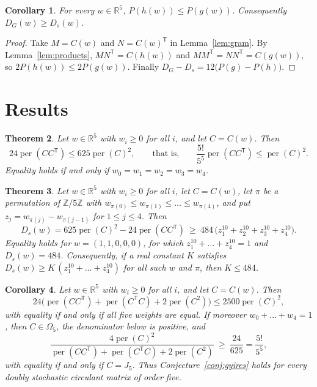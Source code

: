\documentclass[11pt,a4paper]{article}
\newtheorem{theorem}{Theorem}[section]
\newtheorem{corollary}[theorem]{Corollary}
\theoremstyle{definition}
\theoremstyle{remark}
\newcommand{\R}{\mathbb{R}}
\newcommand{\Z}{\mathbb{Z}}
\newcommand{\per}{\operatorname{per}}
\newcommand{\T}{\mathsf{T}}
\begin{document}
\begin{corollary}\label{cor:gram}
For every $w\in\R^5$, $P(h(w))\le P(g(w))$. Consequently $D_G(w)\ge D_s(w)$.
\end{corollary}

\begin{proof}
Take $M=C(w)$ and $N=C(w)^\T$ in Lemma~\ref{lem:gram}. By Lemma~\ref{lem:products}, $MN^\T=C(h(w))$ and
$MM^\T=NN^\T=C(g(w))$, so $2P(h(w))\le2P(g(w))$. Finally $D_G-D_s=12\bigl(P(g)-P(h)\bigr)$.
\end{proof}

\section{Results}\label{sec:results}

\begin{theorem}\label{thm:strong}
Let $w\in\R^5$ with $w_i\ge0$ for all $i$, and let $C=C(w)$. Then
\[
24\per(CC^\T)\le625\per(C)^2,\qquad\text{that is,}\qquad \frac{5!}{5^5}\per(CC^\T)\le\per(C)^2 .
\]
Equality holds if and only if $w_0=w_1=w_2=w_3=w_4$.
\end{theorem}

\begin{theorem}\label{thm:margin}
Let $w\in\R^5$ with $w_i\ge0$ for all $i$, let $C=C(w)$, let $\pi$ be a permutation of $\Z/5\Z$ with
$w_{\pi(0)}\le w_{\pi(1)}\le\dots\le w_{\pi(4)}$, and put $z_j=w_{\pi(j)}-w_{\pi(j-1)}$ for $1\le j\le4$. Then
\[
D_s(w)=625\per(C)^2-24\per(CC^\T)\ \ge\ 484\,\bigl(z_1^{10}+z_2^{10}+z_3^{10}+z_4^{10}\bigr).
\]
Equality holds for $w=(1,1,0,0,0)$, for which $z_1^{10}+\dots+z_4^{10}=1$ and $D_s(w)=484$. Consequently, if a real
constant $K$ satisfies $D_s(w)\ge K\,(z_1^{10}+\dots+z_4^{10})$ for all such $w$ and $\pi$, then $K\le484$.
\end{theorem}

\begin{corollary}\label{cor:gyires}
Let $w\in\R^5$ with $w_i\ge0$ for all $i$, and let $C=C(w)$. Then
\[
24\bigl(\per(CC^\T)+\per(C^\T C)+2\per(C^2)\bigr)\le2500\per(C)^2,
\]
with equality if and only if all five weights are equal. If moreover $w_0+\dots+w_4=1$, then $C\in\Omega_5$, the
denominator below is positive, and
\[
\frac{4\per(C)^2}{\per(CC^\T)+\per(C^\T C)+2\per(C^2)}\ \ge\ \frac{24}{625}=\frac{5!}{5^5},
\]
with equality if and only if $C=J_5$. Thus Conjecture~\ref{conj:gyires} holds for every doubly stochastic circulant
matrix of order five.
\end{corollary}
\end{document}
